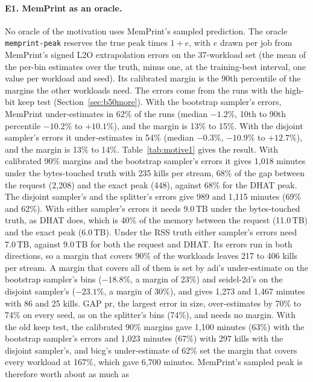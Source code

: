 \documentclass[11pt]{article}
\newcommand{\memprint}{MemPrint}
\begin{document}
\paragraph{E1. \memprint{} as an oracle.} No oracle of the motivation uses \memprint{}'s sampled prediction. The
oracle \texttt{memprint-peak} reserves the true peak times $1 + e$, with $e$ drawn per job from \memprint{}'s signed
L2O extrapolation errors on the 37-workload set (the mean of the per-bin estimates over the truth, minus one, at the
training-best interval, one value per workload and seed). Its calibrated margin is the 90th percentile of the margins
the other workloads need. The errors come from the runs with the high-bit keep test (Section~\ref{sec:b50more}).
With the bootstrap sampler's errors, \memprint{} under-estimates in 62\% of the runs (median $-1.2\%$, 10th to 90th
percentile $-10.2\%$ to $+10.1\%$), and the margin is 13\% to 15\%. With the disjoint sampler's errors it
under-estimates in 54\% (median $-0.3\%$, $-10.9\%$ to $+12.7\%$), and the margin is 13\% to 14\%.
Table~\ref{tab:motive1} gives the result. With calibrated 90\% margins and the bootstrap sampler's errors it gives
1{,}018 minutes under the bytes-touched truth with 235 kills per stream, 68\% of the gap between the request
(2{,}208) and the exact peak (448), against 68\% for the DHAT peak. The disjoint sampler's and the splitter's errors
give 989 and 1{,}115 minutes (69\% and 62\%). With either sampler's errors it needs 9.0\,TB under the
bytes-touched truth, as DHAT does, which is 40\% of the memory between the request (11.0\,TB) and the exact peak
(6.0\,TB). Under the RSS truth either sampler's errors need 7.0\,TB, against 9.0\,TB for both the request and
DHAT. Its errors run in both directions, so a margin that covers 90\% of the workloads leaves 217 to 406 kills per
stream. A margin that covers all of them is set by adi's under-estimate on the bootstrap sampler's bins ($-18.8\%$, a
margin of 23\%) and seidel-2d's on the disjoint sampler's ($-23.1\%$, a margin of 30\%), and gives 1{,}273 and
1{,}467 minutes with 86 and 25 kills. GAP pr, the largest error in size, over-estimates by 70\% to 74\% on every
seed, as on the splitter's bins (74\%), and needs no margin. With the old keep test, the calibrated 90\% margins
gave 1{,}100 minutes (63\%) with the bootstrap sampler's errors and 1{,}023 minutes (67\%) with 297 kills with the
disjoint sampler's, and bicg's under-estimate of 62\% set the margin that covers every workload at 167\%, which gave
6{,}700 minutes. \memprint{}'s sampled peak is therefore worth about as much as
\end{document}
